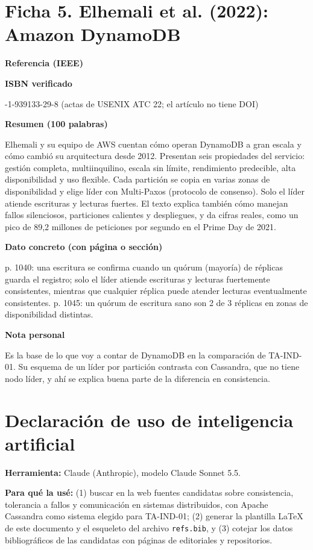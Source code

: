 \documentclass[11pt,a4paper]{article}
\newcommand{\campo}[1]{\par\medskip\noindent\textbf{#1}\par\smallskip}
\begin{document}
	\section*{Ficha 5. Elhemali et al. (2022): Amazon DynamoDB}
	\campo{Referencia (IEEE)}
	\campo{ISBN verificado}
	978-1-939133-29-8 (actas de USENIX ATC 22; el art\'iculo no tiene DOI)
	\campo{Resumen (100 palabras)}
	Elhemali y su equipo de AWS cuentan cómo operan DynamoDB a gran escala y cómo cambió su arquitectura desde 2012. Presentan seis propiedades del servicio: gestión completa, multiinquilino, escala sin límite, rendimiento predecible, alta disponibilidad y uso flexible. Cada partición se copia en varias zonas de disponibilidad y elige líder con Multi-Paxos (protocolo de consenso). Solo el líder atiende escrituras y lecturas fuertes. El texto explica también cómo manejan fallos silenciosos, particiones calientes y despliegues, y da cifras reales, como un pico de 89,2 millones de peticiones por segundo en el Prime Day de 2021.
	\campo{Dato concreto (con p\'agina o secci\'on)}
	p. 1040: una escritura se confirma cuando un quórum (mayoría) de réplicas guarda el registro; solo el líder atiende escrituras y lecturas fuertemente consistentes, mientras que cualquier réplica puede atender lecturas eventualmente consistentes. p. 1045: un quórum de escritura sano son 2 de 3 réplicas en zonas de disponibilidad distintas.
	\campo{Nota personal}
	Es la base de lo que voy a contar de DynamoDB en la comparación de TA-IND-01. Su esquema de un líder por partición contrasta con Cassandra, que no tiene nodo líder, y ahí se explica buena parte de la diferencia en consistencia.
	
	\printbibliography[title={Referencias}]
	
	\section*{Declaraci\'on de uso de inteligencia artificial}
	\textbf{Herramienta:} Claude (Anthropic), modelo Claude Sonnet 5.5.
	
	\textbf{Para qu\'e la us\'e:}
	(1) buscar en la web fuentes candidatas sobre consistencia, tolerancia a fallos y comunicaci\'on
	en sistemas distribuidos, con Apache Cassandra como sistema elegido para TA-IND-01;
	(2) generar la plantilla \LaTeX{} de este documento y el esqueleto del archivo \texttt{refs.bib}, y
	(3) cotejar los datos bibliogr\'aficos de las candidatas con p\'aginas de editoriales y
	repositorios.
	
\end{document}
